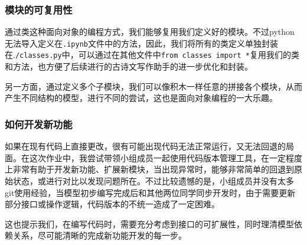 \subsubsection{模块的可复用性}

通过类这种面向对象的编程方式，我们能够复用我们定义好的模块。不过python无法导入定义在\texttt{.ipynb}文件中的方法，因此，我们将所有的类定义单独封装在.\texttt{/classes.py}中，可以通过在其他文件中\texttt{from classes import *}复用我们的类和方法，也方便了后续进行的古诗文写作助手的进一步优化和封装。

另一方面，通过定义多个子模块，我们可以像积木一样任意的拼接各个模块，从而产生不同结构的模型，进行不同的尝试，这也是面向对象编程的一大乐趣。

\subsubsection{如何开发新功能}

如果在现有代码上直接更改，很有可能出现代码无法正常运行，又无法回退的局面。在这次作业中，我尝试带领小组成员一起使用代码版本管理工具，在一定程度上非常有助于开发新功能、扩展新模块，当出现异常时，能够非常简单的回退到原始状态，或进行对比以发现问题所在。不过比较遗憾的是，小组成员并没有太多git使用经验，当模型初步编写完成后和其他两位同学同步开发时，由于需要更新部分接口或操作逻辑，代码版本的不统一造成了一定困难。

这也提示我们，在编写代码时，需要充分考虑到接口的可扩展性，同时理清模型依赖关系，尽可能清晰的完成新功能开发的每一步。